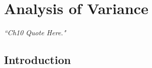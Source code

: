 \chapter{Analysis of Variance}


\begin{flushright}
	\textit{``Ch10 Quote Here."} \\
\end{flushright}

\section{Introduction}


